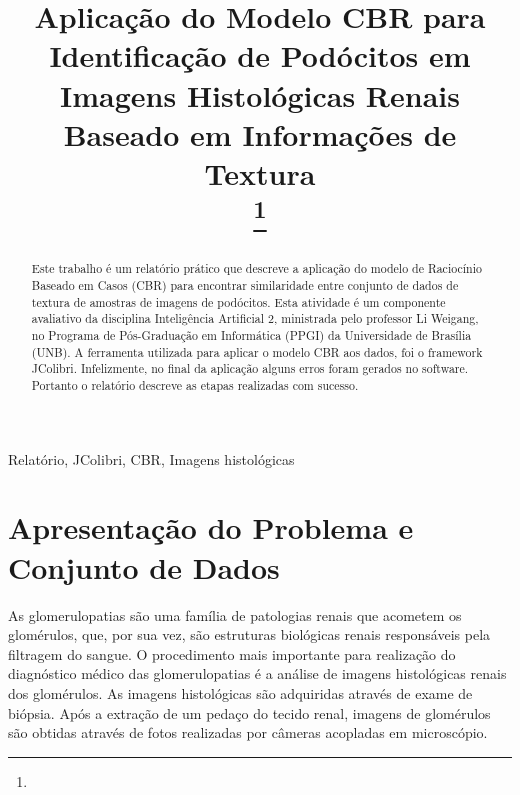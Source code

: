 \documentclass[conference]{IEEEtran}
\begin{document}
\title{Aplicação do Modelo CBR para Identificação de Podócitos em Imagens Histológicas Renais Baseado em Informações de Textura\\
	\thanks{}
}

\author{
}

\maketitle

\begin{abstract}
Este trabalho é um relatório prático que descreve a aplicação do modelo de Raciocínio Baseado em Casos (CBR) para encontrar similaridade entre conjunto de dados de textura de amostras de imagens de podócitos. Esta atividade é um componente avaliativo da disciplina Inteligência Artificial 2, ministrada pelo professor Li Weigang, no Programa de Pós-Graduação em Informática (PPGI) da Universidade de Brasília (UNB). A ferramenta utilizada para aplicar o modelo CBR aos dados, foi o framework JColibri. Infelizmente, no final da aplicação alguns erros foram gerados no software. Portanto o relatório descreve as etapas realizadas com sucesso. 
\end{abstract}

\begin{IEEEkeywords}
Relatório, JColibri, CBR, Imagens histológicas
\end{IEEEkeywords}

\section{Apresentação do Problema e Conjunto de Dados}
As glomerulopatias são uma família de patologias renais que acometem os glomérulos, que, por sua vez, são estruturas biológicas renais responsáveis pela filtragem do sangue. O procedimento mais importante para realização do diagnóstico médico das glomerulopatias é a análise de imagens histológicas renais dos glomérulos. As imagens histológicas são adquiridas através de exame de biópsia. Após a extração de um pedaço do tecido renal, imagens de glomérulos são obtidas através de fotos realizadas por câmeras acopladas em microscópio. 
\end{document}
